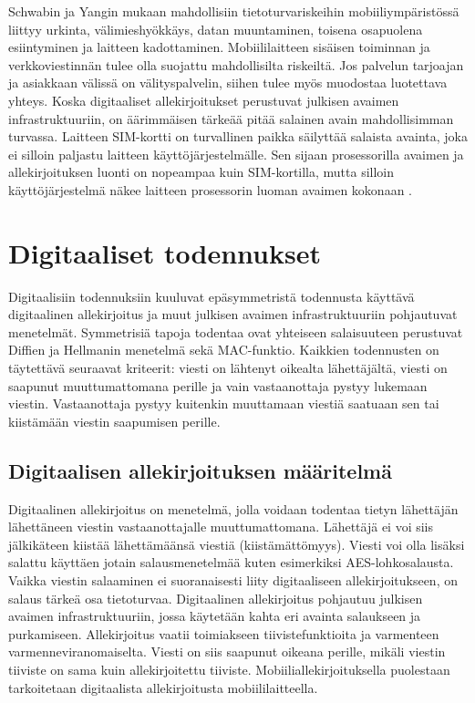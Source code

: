 \documentclass[finnish]{tktltiki2}
\theoremstyle{definition}
\theoremstyle{remark}
\begin{document}
Schwabin ja Yangin mukaan \cite{enti} mahdollisiin tietoturvariskeihin mobiiliympäristössä liittyy urkinta, välimieshyökkäys, datan muuntaminen, toisena osapuolena esiintyminen ja laitteen kadottaminen. Mobiililaitteen sisäisen toiminnan ja verkkoviestinnän tulee olla suojattu mahdollisilta riskeiltä. Jos palvelun tarjoajan ja asiakkaan välissä on välityspalvelin, siihen tulee myös muodostaa luotettava yhteys. Koska digitaaliset allekirjoitukset perustuvat julkisen avaimen infrastruktuuriin, on äärimmäisen tärkeää pitää salainen avain mahdollisimman turvassa. Laitteen SIM-kortti on turvallinen paikka säilyttää salaista avainta, joka ei silloin paljastu laitteen käyttöjärjestelmälle. Sen sijaan prosessorilla avaimen ja allekirjoituksen luonti on nopeampaa kuin SIM-kortilla, mutta silloin käyttöjärjestelmä näkee laitteen prosessorin luoman avaimen kokonaan \cite{proxy}.        


\section{Digitaaliset todennukset}

Digitaalisiin todennuksiin kuuluvat epäsymmetristä todennusta käyttävä digitaalinen allekirjoitus ja muut julkisen avaimen infrastruktuuriin pohjautuvat menetelmät. Symmetrisiä tapoja todentaa ovat yhteiseen salaisuuteen perustuvat Diffien ja Hellmanin menetelmä sekä MAC-funktio. Kaikkien todennusten on täytettävä seuraavat kriteerit: viesti on lähtenyt oikealta lähettäjältä, viesti on saapunut muuttumattomana perille ja vain vastaanottaja pystyy lukemaan viestin. Vastaanottaja pystyy kuitenkin muuttamaan viestiä saatuaan sen tai kiistämään viestin saapumisen perille.


\subsection{Digitaalisen allekirjoituksen määritelmä}

Digitaalinen allekirjoitus on menetelmä, jolla voidaan todentaa tietyn lähettäjän lähettäneen viestin vastaanottajalle muuttumattomana. Lähettäjä ei voi siis jälkikäteen kiistää lähettämäänsä viestiä (kiistämättömyys). Viesti voi olla lisäksi salattu käyttäen jotain salausmenetelmää kuten esimerkiksi AES-lohkosalausta. Vaikka viestin salaaminen ei suoranaisesti liity digitaaliseen allekirjoitukseen, on salaus tärkeä osa tietoturvaa. Digitaalinen allekirjoitus pohjautuu julkisen avaimen infrastruktuuriin, jossa käytetään kahta eri avainta salaukseen ja purkamiseen. Allekirjoitus vaatii toimiakseen tiivistefunktioita ja varmenteen varmenneviranomaiselta. Viesti on siis saapunut oikeana perille, mikäli viestin tiiviste on sama kuin allekirjoitettu tiiviste. Mobiiliallekirjoituksella puolestaan tarkoitetaan digitaalista allekirjoitusta mobiililaitteella.
\end{document}
